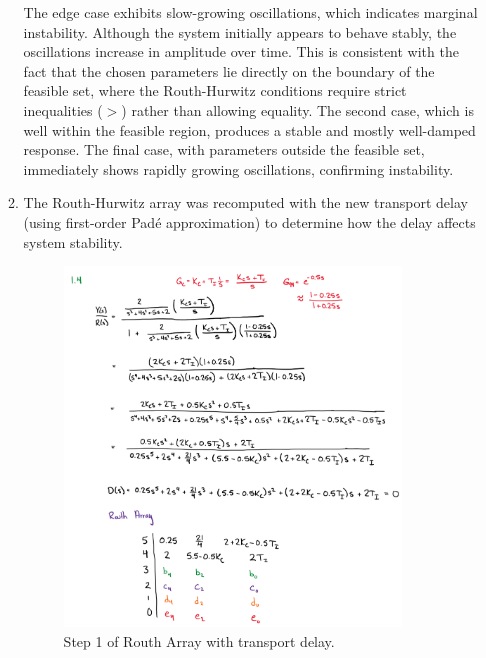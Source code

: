 \documentclass[12pt]{article}
\begin{document}
\begin{enumerate}
\begin{enumerate}
      The edge case exhibits slow-growing oscillations, which indicates marginal instability. Although the system initially appears to behave stably, the oscillations increase in amplitude over time. This is consistent with the fact that the chosen parameters lie directly on the boundary of the feasible set, where the Routh-Hurwitz conditions require strict inequalities ($>$) rather than allowing equality. The second case, which is well within the feasible region, produces a stable and mostly well-damped response. The final case, with parameters outside the feasible set, immediately shows rapidly growing oscillations, confirming instability.

      \clearpage
      \item 
      The Routh-Hurwitz array was recomputed with the new transport delay (using first-order Padé approximation) to determine how the delay affects system stability.
  
      \begin{figure}[H]
        \centering
        \includegraphics[width=0.9\textwidth]{Figures/figure1-4a.png}
        \caption{Step 1 of Routh Array with transport delay.}
      \end{figure}
  

\end{enumerate}
\end{enumerate}
\end{document}
